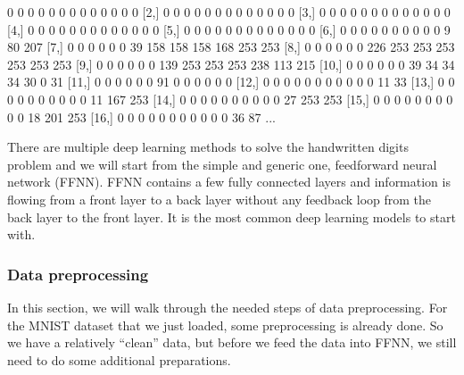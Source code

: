 \documentclass[12pt,]{krantz}
\makeatletter
\newenvironment{Shaded}{\begin{snugshade}}{\end{snugshade}}
\newcommand{\NormalTok}[1]{#1}
\newenvironment{kframe}{%
\medskip{}
\setlength{\fboxsep}{.8em}
 \def\at@end@of@kframe{}%
 \ifinner\ifhmode%
  \def\at@end@of@kframe{\end{minipage}}%
  \begin{minipage}{\columnwidth}%
 \fi\fi%
 \def\FrameCommand##1{\hskip\@totalleftmargin \hskip-\fboxsep
 \colorbox{shadecolor}{##1}\hskip-\fboxsep
     \hskip-\linewidth \hskip-\@totalleftmargin \hskip\columnwidth}%
 \MakeFramed {\advance\hsize-\width
   \@totalleftmargin\z@ \linewidth\hsize
   \@setminipage}}%
 {\par\unskip\endMakeFramed%
 \at@end@of@kframe}
\renewenvironment{Shaded}{\begin{kframe}}{\end{kframe}}
\makeatother
\begin{document}
\begin{Shaded}
\begin{Highlighting}[]
\NormalTok{     [,1] [,2] [,3] [,4] [,5] [,6] [,7] [,8] [,9] [,10] [,11] [,12] [,13]}
\NormalTok{ [1,]    0    0    0    0    0    0    0    0    0     0     0     0     0}
\NormalTok{ [2,]    0    0    0    0    0    0    0    0    0     0     0     0     0}
\NormalTok{ [3,]    0    0    0    0    0    0    0    0    0     0     0     0     0}
\NormalTok{ [4,]    0    0    0    0    0    0    0    0    0     0     0     0     0}
\NormalTok{ [5,]    0    0    0    0    0    0    0    0    0     0     0     0     0}
\NormalTok{ [6,]    0    0    0    0    0    0    0    0    0     0     9    80   207}
\NormalTok{ [7,]    0    0    0    0    0    0   39  158  158   158   168   253   253}
\NormalTok{ [8,]    0    0    0    0    0    0  226  253  253   253   253   253   253}
\NormalTok{ [9,]    0    0    0    0    0    0  139  253  253   253   238   113   215}
\NormalTok{[10,]    0    0    0    0    0    0   39   34   34    34    30     0    31}
\NormalTok{[11,]    0    0    0    0    0    0   91    0    0     0     0     0     0}
\NormalTok{[12,]    0    0    0    0    0    0    0    0    0     0     0    11    33}
\NormalTok{[13,]    0    0    0    0    0    0    0    0    0     0    11   167   253}
\NormalTok{[14,]    0    0    0    0    0    0    0    0    0     0    27   253   253}
\NormalTok{[15,]    0    0    0    0    0    0    0    0    0     0    18   201   253}
\NormalTok{[16,]    0    0    0    0    0    0    0    0    0     0     0    36    87}
\NormalTok{...}
\end{Highlighting}
\end{Shaded}

There are multiple deep learning methods to solve the handwritten digits problem and we will start from the simple and generic one, feedforward neural network (FFNN). FFNN contains a few fully connected layers and information is flowing from a front layer to a back layer without any feedback loop from the back layer to the front layer. It is the most common deep learning models to start with.

\hypertarget{data-preprocessing}{%
\subsubsection{Data preprocessing}\label{data-preprocessing}}

In this section, we will walk through the needed steps of data preprocessing. For the MNIST dataset that we just loaded, some preprocessing is already done. So we have a relatively ``clean'' data, but before we feed the data into FFNN, we still need to do some additional preparations.
\end{document}
